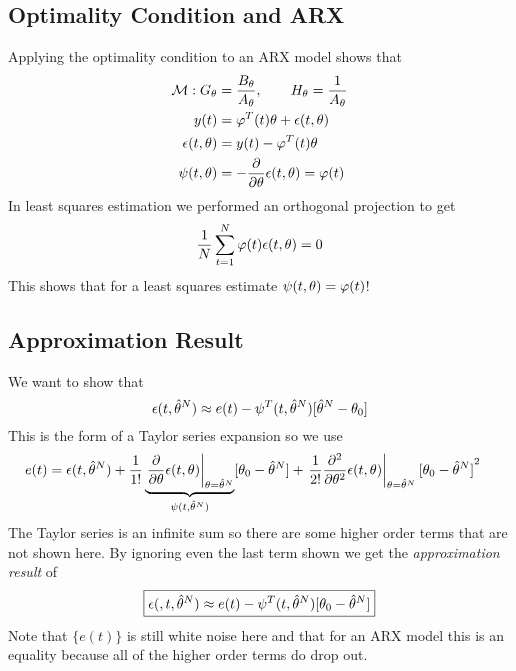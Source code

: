 \subsection{Optimality Condition and ARX}
Applying the optimality condition to an ARX model shows that
\begin{align*}
\mathcal{M}: G_\theta&=\frac{B_\theta}{A_\theta}, \qquad H_\theta=\frac{1}{A_\theta} \\
y(t)&= \varphi^T(t)\theta+\epsilon(t,\theta) \\
\epsilon(t,\theta) &= y(t)-\varphi^T(t)\theta \\
\psi(t,\theta) &= -\frac{\partial}{\partial\theta}\epsilon(t,\theta) = \varphi(t)
\end{align*}
In least squares estimation we performed an orthogonal projection to get
\begin{align*}
\frac{1}{N}\sum_{t=1}^N\varphi(t)\epsilon(t,\theta) = 0
\end{align*}
This shows that for a least squares estimate $\psi(t,\theta) = \varphi(t)$!

\subsection{Approximation Result}
We want to show that
$$\epsilon(t,\hat{\theta}^N) \approx e(t) - \psi^T(t,\hat{\theta}^N)[\hat{\theta}^N-\theta_0]$$
This is the form of a Taylor series expansion so we use
\begin{align*}
e(t) &= \epsilon(t,\hat{\theta}^N) + \frac{1}{1!}\underbrace{\left.\frac{\partial}{\partial\theta}\epsilon(t,\theta)\right|_{\theta=\hat{\theta}^N}}_{\psi(t,\hat{\theta}^N)}[\theta_0-\hat{\theta}^N] + \left.\frac{1}{2!}\frac{\partial^2}{\partial\theta^2}\epsilon(t,\theta)\right|_{\theta=\hat{\theta}^N}{[\theta_0-\hat{\theta}^N]}^2
\end{align*}
The Taylor series is an infinite sum so there are some higher order terms that are not shown here.
By ignoring even the last term shown we get the \textit{approximation result} of
\begin{align}
\label{eq:14approximation}
\boxed{\epsilon(,t,\hat{\theta}^N) \approx e(t) - \psi^T(t,\hat{\theta}^N)[\theta_0-\hat{\theta}^N]}
\end{align}
Note that $\{e(t)\}$ is still white noise here and that for an ARX model this is an equality because all of the higher order terms do drop out.

